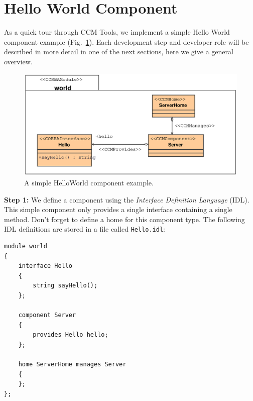 \section{Hello World Component}
\label{HelloWorldComponent}

As a quick tour through CCM Tools, we implement a simple Hello World 
component example (Fig.~\ref{fig:uml-helloworld}). 
Each development step and developer role will be described 
in more detail in one of the next sections, here we give a general overview.

\begin{figure}[htb]
    \begin{center}
        \includegraphics [width=12cm,angle=0] {uml/Hello}
        \caption{A simple HelloWorld component example.}
        \label{fig:uml-helloworld}
    \end{center}
\end{figure}

\vspace{3mm}
\noindent
{\bf Step 1:} We define a component using the 
{\it Interface Definition Language} (IDL). 
This simple component only provides a single interface containing a single
method. Don't forget to define a home for this component type.
The following IDL definitions are stored in
a file called {\tt Hello.idl}:
\begin{small}
\begin{verbatim}
module world
{ 
    interface Hello 
    { 
        string sayHello(); 
    }; 

    component Server 
    { 
        provides Hello hello;
    }; 

    home ServerHome manages Server
    {
    };
};
\end{verbatim}
\end{small}


